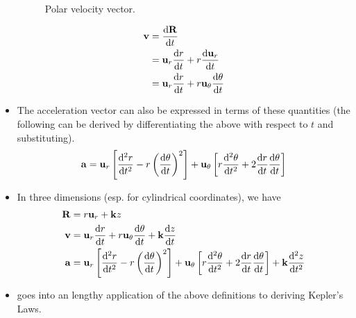 \documentclass[../main.tex]{subfiles}
\begin{document}
\begin{itemize}
\begin{figure}[h!]
        \caption{Polar velocity vector.}
        \label{fig:polarVelocityVector}
    \end{figure}
    \begin{align*}
        \vb{v} &= \dv{\vb{R}}{t}\\
        &= \vb{u}_r\dv{r}{t}+r\dv{\vb{u}_r}{t}\\
        &= \vb{u}_r\dv{r}{t}+r\vb{u}_\theta\dv{\theta}{t}
    \end{align*}
    \item The acceleration vector can also be expressed in terms of these quantities (the following can be derived by differentiating the above with respect to $t$ and substituting).
    \begin{equation*}
        \vb{a} = \vb{u}_r\left[ \dv[2]{r}{t}-r\left( \dv{\theta}{t} \right)^2 \right]+\vb{u}_\theta\left[ r\dv[2]{\theta}{t}+2\dv{r}{t}\dv{\theta}{t} \right]
    \end{equation*}
    \item In three dimensions (esp. for cylindrical coordinates), we have
    \begin{align*}
        \vb{R} &= r\vb{u}_r+\vb{k}z\\
        \vb{v} &= \vb{u}_r\dv{r}{t}+r\vb{u}_\theta\dv{\theta}{t}+\vb{k}\dv{z}{t}\\
        \vb{a} &= \vb{u}_r\left[ \dv[2]{r}{t}-r\left( \dv{\theta}{t} \right)^2 \right]+\vb{u}_\theta\left[ r\dv[2]{\theta}{t}+2\dv{r}{t}\dv{\theta}{t} \right]+\vb{k}\dv[2]{z}{t}
    \end{align*}
    \item \cite{bib:Thomas} goes into an lengthy application of the above definitions to deriving Kepler's Laws.
\end{itemize}
\end{document}

